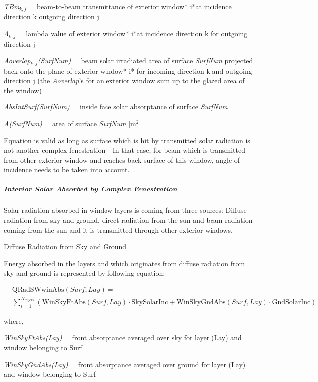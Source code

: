 \emph{TBm\(_{k,j}\)} = beam-to-beam transmittance of exterior window* i*at incidence direction k outgoing direction j

\emph{Λ\(_{k,j}\)} = lambda value of exterior window* i*at incidence direction k for outgoing direction j

\emph{Aoverlap\(_{k,j}\)(SurfNum)} = beam solar irradiated area of surface \emph{SurfNum} projected back onto the plane of exterior window* i* for incoming direction k and outgoing direction j (the \emph{Aoverlap}'s for an exterior window sum up to the glazed area of the window)

\emph{AbsIntSurf(SurfNum)} = inside face solar absorptance of surface \emph{SurfNum}

\emph{A(SurfNum)} = area of surface \emph{SurfNum} {[}m\(^{2}\){]}

Equation is valid as long as surface which is hit by transmitted solar radiation is not another complex fenestration.~ In that case, for beam which is transmitted from other exterior window and reaches back surface of this window, angle of incidence needs to be taken into account.

\subparagraph{Interior Solar Absorbed by Complex Fenestration}\label{interior-solar-absorbed-by-complex-fenestration}

Solar radiation absorbed in window layers is coming from three sources: Diffuse radiation from sky and ground, direct radiation from the sun and beam radiation coming from the sun and it is transmitted through other exterior windows.

Diffuse Radiation from Sky and Ground

Energy absorbed in the layers and which originates from diffuse radiation from sky and ground is represented by following equation:

\begin{equation}
\begin{split}
&\text{QRadSWwinAbs}(Surf, Lay) = \\
&\sum_{i = 1}^{N_{layers}} \left(\text{WinSkyFtAbs}(Surf, Lay) \cdot \text{SkySolarInc} + \text{WinSkyGndAbs}(Surf, Lay) \cdot \text{GndSolarInc}\right)
\end{split}
\end{equation}

where,

\emph{WinSkyFtAbs(Lay)} = front absorptance averaged over sky for layer (Lay) and window belonging to Surf

\emph{WinSkyGndAbs(Lay)} = front absorptance averaged over ground for layer (Lay) and window belonging to Surf

